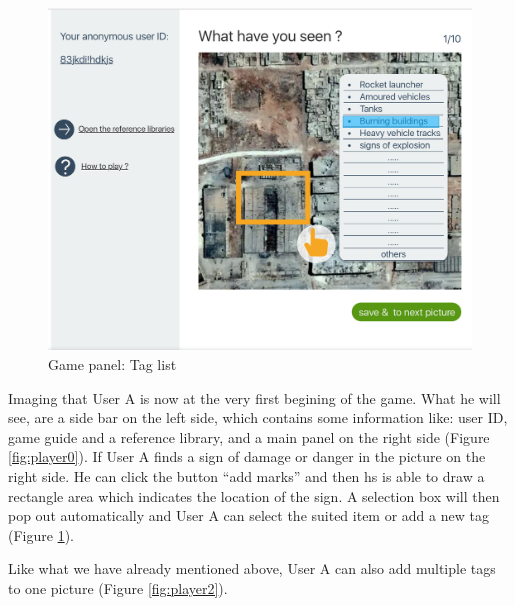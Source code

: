 \noindent\begin{minipage}{.45\textwidth}
\begin{figure}[H]
\centering
\includegraphics[width=\textwidth]{figures/function-player-1}
\caption{Game panel: Tag list}
\label{fig:player1}
\end{figure}
\end{minipage}\hfill

Imaging that User A is now at the very first begining of the game.
What he will see,
are a side bar on the left side,
which contains some information like:
user ID,
game guide and a reference library,
and a main panel on the right side (Figure \ref{fig:player0}).
If User A finds a sign of damage or danger in the picture on the right side.
He can click the button ``add marks'' and then hs is able to draw a rectangle area which indicates the location of the sign.
A selection box will then pop out automatically and User A can select the suited item or add a new tag (Figure \ref{fig:player1}).

Like what we have already mentioned above,
User A can also add multiple tags to one picture (Figure \ref{fig:player2}).


